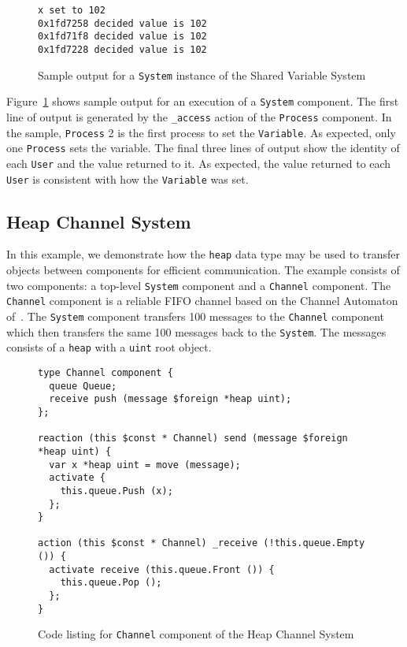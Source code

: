 \begin{figure}
\begin{verbatim}
x set to 102
0x1fd7258 decided value is 102
0x1fd71f8 decided value is 102
0x1fd7228 decided value is 102
\end{verbatim}
\cprotect\caption{Sample output for a \verb+System+ instance of the Shared Variable System}
\label{system_output}
\end{figure}

Figure~\ref{system_output} shows sample output for an execution of a \verb+System+ component.
The first line of output is generated by the \verb+_access+ action of the \verb+Process+ component.
In the sample, \verb+Process+ 2 is the first process to set the \verb+Variable+.
As expected, only one \verb+Process+ sets the variable.
The final three lines of output show the identity of each \verb+User+ and the value returned to it.
As expected, the value returned to each \verb+User+ is consistent with how the \verb+Variable+ was set.

\subsection{Heap Channel System}

In this example, we demonstrate how the \verb+heap+ data type may be used to transfer objects between components for efficient communication.
The example consists of two components:  a top-level \verb+System+ component and a \verb+Channel+ component.
The \verb+Channel+ component is a reliable FIFO channel based on the Channel Automaton of~\cite{nancy1996distributed}.
The \verb+System+ component transfers 100 messages to the \verb+Channel+ component which then transfers the same 100 messages back to the \verb+System+.
The messages consists of a \verb+heap+ with a \verb+uint+ root object.

\begin{figure}
\begin{verbatim}
type Channel component {
  queue Queue;
  receive push (message $foreign *heap uint);
};

reaction (this $const * Channel) send (message $foreign *heap uint) {
  var x *heap uint = move (message);
  activate {
    this.queue.Push (x);
  };
}

action (this $const * Channel) _receive (!this.queue.Empty ()) {
  activate receive (this.queue.Front ()) {
    this.queue.Pop ();
  };
}
\end{verbatim}
\cprotect\caption{Code listing for \verb+Channel+ component of the Heap Channel System}
\label{channel_listing}
\end{figure}

